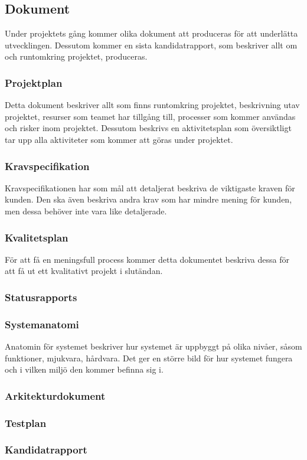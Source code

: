 \subsection{Dokument}
Under projektets gång kommer olika dokument att produceras för att underlätta utvecklingen.
Dessutom kommer en sista kandidatrapport, som beskriver allt om och runtomkring projektet,
produceras.

\subsubsection*{Projektplan}
Detta dokument beskriver allt som finns runtomkring projektet, beskrivning utav projektet, 
resurser som teamet har tillgång till, processer som kommer användas och risker inom projektet.
Dessutom beskrivs en aktivitetsplan som översiktligt tar upp alla aktiviteter som kommer att
göras under projektet.

\subsubsection*{Kravspecifikation}
Kravspecifikationen har som mål att detaljerat beskriva de viktigaste kraven för kunden.
Den ska även beskriva andra krav som har mindre mening för kunden, men dessa behöver inte vara
like detaljerade.

\subsubsection*{Kvalitetsplan}
För att få en meningsfull process kommer detta dokumentet beskriva dessa för att få ut ett 
kvalitativt projekt i slutändan.

\subsubsection*{Statusrapports}


\subsubsection*{Systemanatomi}
Anatomin för systemet beskriver hur systemet är uppbyggt på olika nivåer, såsom funktioner, 
mjukvara, hårdvara. Det ger en större bild för hur systemet fungera och i vilken miljö den kommer
befinna sig i.

\subsubsection*{Arkitekturdokument}


\subsubsection*{Testplan}


\subsubsection*{Kandidatrapport}


